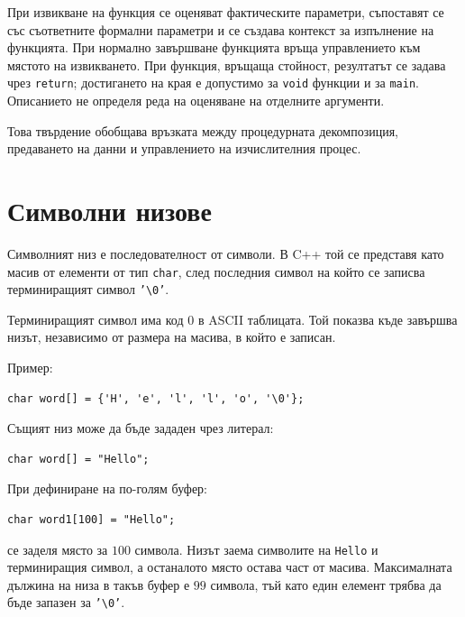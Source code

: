 \begin{keydefn}
При извикване на функция се оценяват фактическите параметри, съпоставят се със съответните формални параметри и се създава контекст за изпълнение на функцията. При нормално завършване функцията връща управлението към мястото на извикването. При функция, връщаща стойност, резултатът се задава чрез \texttt{return}; достигането на края е допустимо за \texttt{void} функции и за \texttt{main}. Описанието не определя реда на оценяване на отделните аргументи.
\end{keydefn}

Това твърдение обобщава връзката между процедурната декомпозиция, предаването на данни и управлението на изчислителния процес.

\section{Символни низове}\label{s:14.7}

\begin{defn}
Символният низ е последователност от символи. В C++ той се представя като масив от елементи от тип \texttt{char}, след последния символ на който се записва терминиращият символ \texttt{'\textbackslash 0'}.
\end{defn}

Терминиращият символ има код $0$ в ASCII таблицата. Той показва къде завършва низът, независимо от размера на масива, в който е записан.

Пример:

\begin{verbatim}
char word[] = {'H', 'e', 'l', 'l', 'o', '\0'};
\end{verbatim}

Същият низ може да бъде зададен чрез литерал:

\begin{verbatim}
char word[] = "Hello";
\end{verbatim}

При дефиниране на по-голям буфер:

\begin{verbatim}
char word1[100] = "Hello";
\end{verbatim}

се заделя място за $100$ символа. Низът заема символите на \texttt{Hello} и терминиращия символ, а останалото място остава част от масива. Максималната дължина на низа в такъв буфер е $99$ символа, тъй като един елемент трябва да бъде запазен за \texttt{'\textbackslash 0'}.


